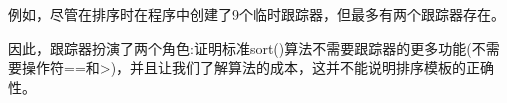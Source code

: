 例如，尽管在排序时在程序中创建了9个临时跟踪器，但最多有两个跟踪器存在。

因此，跟踪器扮演了两个角色:证明标准sort()算法不需要跟踪器的更多功能(不需要操作符==和>)，并且让我们了解算法的成本，这并不能说明排序模板的正确性。




































